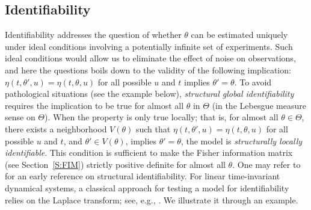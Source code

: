 \documentclass[a4paper]{article}
\theoremstyle{definition}
\theoremstyle{remark}
\begin{document}
\subsection{Identifiability}
Identifiability addresses the question of whether $\theta$ can be estimated uniquely under ideal conditions involving a potentially infinite set of experiments. Such ideal conditions would allow us to eliminate the effect of noise on observations, and here the questions boils down to the validity of the following implication: $\eta(t,\theta',u)=\eta(t,\theta,u)$ for all possible $u$ and $t$ implies $\theta'=\theta$. To avoid pathological situations (see the example below), {\em structural global identifiability} requires the implication to be true for almost all $\theta$ in $\Theta$ (in the Lebesgue measure sense on $\Theta$). When the property is only true locally; that is, for almost all $\theta\in\Theta$, there exists a neighborhood $V(\theta)$ such that $\eta(t,\theta',u)=\eta(t,\theta,u)$ for all possible $u$ and $t$, and $\theta'\in V(\theta)$, implies $\theta'=\theta$, the model is {\em structurally locally identifiable}. This condition is sufficient to make the Fisher information matrix (see Section~\ref{S:FIM}) strictly positive definite for almost all $\theta$. One may refer to \cite{KoopmansR50} for an early reference on structural identifiability. For linear time-invariant dynamical systems, a classical approach for testing a model for identifiability relies on the Laplace transform; see, e.g., \cite{BellmanA70, WPl93}. 
We illustrate it through an example.
\end{document}
